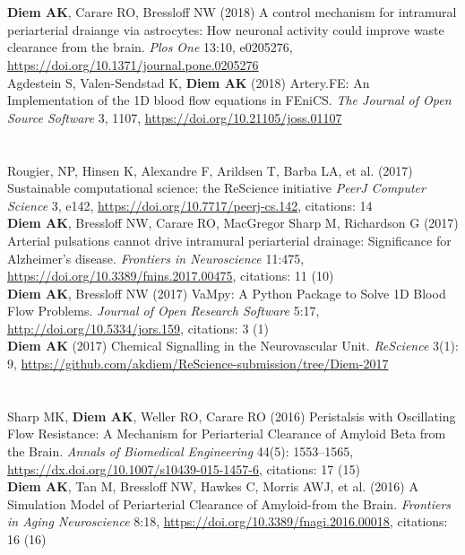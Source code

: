 \documentclass[margin,line,10pt]{res}
\begin{document}
\begin{resume}
\section{}
{\bf Diem AK}, Carare RO, Bressloff NW (2018) A control mechanism for intramural periarterial draiange via astrocytes: How neuronal activity could improve waste clearance from the brain. \textit{Plos One} 13:10, e0205276, \url{https://doi.org/10.1371/journal.pone.0205276}\\
Agdestein S, Valen-Sendstad K, {\bf Diem AK} (2018) Artery.FE: An Implementation of the 1D blood flow equations in FEniCS. \textit{The Journal of Open Source Software} 3, 1107, \url{https://doi.org/10.21105/joss.01107}\\        
\vspace*{-.35in}
\section{}
Rougier, NP, Hinsen K, Alexandre F, Arildsen T, Barba LA, et al. (2017) Sustainable computational science: the ReScience initiative \textit{PeerJ Computer Science} 3, e142, \url{https://doi.org/10.7717/peerj-cs.142}, citations: 14\\
{\bf Diem AK}, Bressloff NW, Carare RO, MacGregor Sharp M, Richardson G (2017) Arterial pulsations cannot drive intramural periarterial drainage: Significance for Alzheimer's disease. \textit{Frontiers in Neuroscience} 11:475, \url{https://doi.org/10.3389/fnins.2017.00475}, citations: 11 (10)\\
{\bf Diem AK}, Bressloff NW (2017) VaMpy: A Python Package to Solve 1D Blood Flow Problems. {\em Journal of Open Research Software} 5:17, \url{http://doi.org/10.5334/jors.159}, citations: 3 (1)\\
{\bf Diem AK} (2017) Chemical Signalling in the Neurovascular Unit. \textit{ReScience} 3(1): 9, \url{https://github.com/akdiem/ReScience-submission/tree/Diem-2017}\\
\vspace*{-.35in}
\section{}
Sharp MK, {\bf Diem AK}, Weller RO, Carare RO (2016) Peristalsis with Oscillating Flow Resistance: A Mechanism for Periarterial Clearance of Amyloid Beta from the Brain. \textit{Annals of Biomedical Engineering} 44(5): 1553--1565, \url{https://dx.doi.org/10.1007/s10439-015-1457-6}, citations: 17 (15)\\
{\bf Diem AK}, Tan M, Bressloff NW, Hawkes C, Morris AWJ, et al. (2016) A Simulation Model of Periarterial Clearance of Amyloid-\textbeta from the Brain. \textit{Frontiers in Aging Neuroscience} 8:18, \url{https://doi.org/10.3389/fnagi.2016.00018}, citations: 16 (16)\\

\end{resume}
\end{document}
